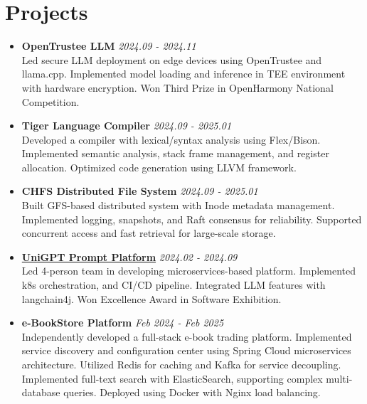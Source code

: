 \documentclass[a4paper]{article}
\begin{document}
\section*{Projects}
\begin{itemize}[leftmargin=*,label={},itemsep=0.3em,topsep=0.1em]
\item \textbf{OpenTrustee LLM} \hfill \textit{2024.09 - 2024.11}\\
Led secure LLM deployment on edge devices using OpenTrustee and llama.cpp. Implemented model loading and inference in TEE environment with hardware encryption. Won Third Prize in OpenHarmony National Competition.

\item \textbf{Tiger Language Compiler} \hfill \textit{2024.09 - 2025.01}\\
Developed a compiler with lexical/syntax analysis using Flex/Bison. Implemented semantic analysis, stack frame management, and register allocation. Optimized code generation using LLVM framework.

\item \textbf{CHFS Distributed File System} \hfill \textit{2024.09 - 2025.01}\\
Built GFS-based distributed system with Inode metadata management. Implemented logging, snapshots, and Raft consensus for reliability. Supported concurrent access and fast retrieval for large-scale storage.

\item \textbf{\href{https://base.sjtu.edu.cn/se/Awards.html}{UniGPT Prompt Platform}} \hfill \textit{2024.02 - 2024.09}\\
Led 4-person team in developing microservices-based platform. Implemented k8s orchestration, and CI/CD pipeline. Integrated LLM features with langchain4j. Won Excellence Award in Software Exhibition.

\item \textbf{e-BookStore Platform} \hfill \textit{Feb 2024 - Feb 2025}\\
Independently developed a full-stack e-book trading platform. Implemented service discovery and configuration center using Spring Cloud microservices architecture. Utilized Redis for caching and Kafka for service decoupling. Implemented full-text search with ElasticSearch, supporting complex multi-database queries. Deployed using Docker with Nginx load balancing.
\end{itemize}
\end{document}
